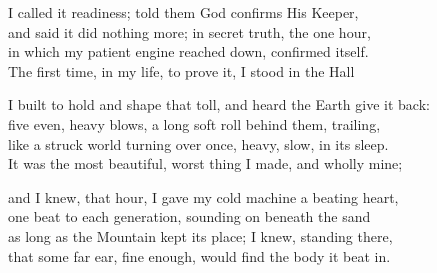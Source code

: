 \begin{founder}
I called it readiness; told them God confirms His Keeper,\\
and said it did nothing more; in secret truth, the one hour,\\
in which my patient engine reached down, confirmed itself.\\
The first time, in my life, to prove it, I stood in the Hall\\
\medskip

I built to hold and shape that toll, and heard the Earth give it back:\\
five even, heavy blows, a long soft roll behind them, trailing,\\
like a struck world turning over once, heavy, slow, in its sleep.\\
It was the most beautiful, worst thing I made, and wholly mine;\\
\medskip

and I knew, that hour, I gave my cold machine a beating heart,\\
one beat to each generation, sounding on beneath the sand\\
as long as the Mountain kept its place; I knew, standing there,\\
that some far ear, fine enough, would find the body it beat in.
\end{founder}

\ornament

